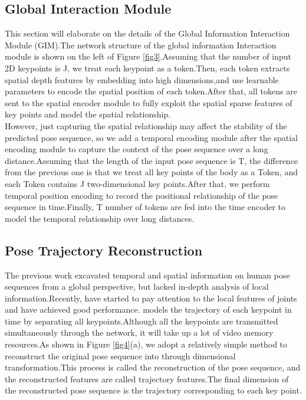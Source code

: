 \documentclass{article}
\begin{document}
\subsection{Global Interaction Module}
This section will elaborate on the details of the Global Information Interaction Module (GIM).The network structure of the global information Interaction module is shown on the left of Figure \ref{fig3}.Assuming that the number of input 2D keypoints is J, we treat each keypoint as a token.Then, each token extracts spatial depth features by embedding into high dimensions,and use learnable parameters  to encode the spatial position of each token.After that, all tokens are sent to the spatial encoder module to fully exploit the spatial sparse features of key points and model the spatial relationship.\\
However, just capturing the spatial relationship may affect the stability of the predicted pose sequence, so we add a temporal encoding module after the spatial encoding module to capture the context of the pose sequence over a long distance.Assuming that the length of the input pose sequence is T, the difference from the previous one is that we treat all key points of the body as a Token, and each Token contains J two-dimensional key points.After that, we perform temporal position encoding  to record the positional relationship of the pose sequence in time.Finally, T number of tokens are fed into the time encoder to model the temporal relationship over long distances.
\subsection{Pose Trajectory Reconstruction}
The previous work \cite{pavllo20193d,zheng20213d} excavated temporal and spatial information on human pose sequences from a global perspective, but lacked in-depth analysis of local information.Recently, \cite{hassanin2022crossformer} have started to pay attention to the local features of joints and have achieved good performance.\cite{zhang2022mixste} models the trajectory of each keypoint in time by separating all keypoints.Although all the keypoints are transmitted simultaneously through the network, it will take up a lot of video memory resources.As shown in Figure \ref{fig4}(a), we adopt a relatively simple method to reconstruct the original pose sequence  into  through dimensional transformation.This process is called the reconstruction of the pose sequence, and the reconstructed features are called trajectory features.The final dimension of the reconstructed pose sequence is the trajectory corresponding to each key point.
\end{document}
